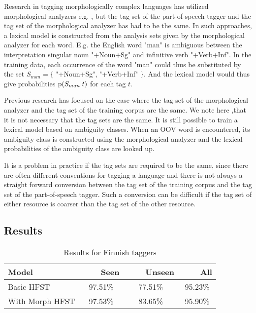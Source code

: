 \documentclass{llncs}
\begin{document}
Research in tagging morphologically complex languages has utilized
 morphological analyzers e.g. \cite{Tzoukerman:1996,Oravecz:2002}, but
 the tag set of the part-of-speech tagger and the tag set of the
 morphological analyzer has had to be the same. In such approaches, a
 lexical model is constructed from the analysis sets given by the
 morphological analyzer for each word. E.g. the English word "man" is
 ambiguous between the interpretation singular noun "+Noun+Sg" and
 infinitive verb "+Verb+Inf". In the training data, each occurrence of
 the word "man" could thus be substituted by the set $S_{man} = \{$
 "+Noun+Sg", "+Verb+Inf" $\}$. And the lexical model would thus give
 probabilities ${\rm p}(S_{man}|t)$ for each tag $t$. 

Previous research has focused on the case where the tag set of the
 morphological analyzer and the tag set of the training corpus are the
 same. We note here ,that it is not necessary that the tag sets are
 the same. It is still possible to train a lexical model based on
 ambiguity classes. When an OOV word is encountered, its ambiguity
 class is constructed using the morphological analyzer and the lexical
 probabilities of the ambiguity class are looked up.

It is a problem in practice if the tag sets are required to be the
 same, since there are often different conventions for tagging a
 language and there is not always a straight forward conversion
 between the tag set of the training corpus and the tag set of the
 part-of-speech tagger. Such a conversion can be difficult if the tag
 set of either resource is coarser than the tag set of the other
 resource.

\subsection{Results}

\begin{table}
\caption{Results for Finnish taggers}
\begin{center}
\begin{tabular}{lccc}
\hline 
Model            & ~~~~Seen & ~~~~Unseen & ~~~~All \\
\hline 
Basic HFST       &  97.51\% &    77.51\% & 95.23\% \\
With Morph HFST  &  97.53\% &    83.65\% & 95.90\% \\
\hline
\end{tabular}
\end{center}
\end{table}
\end{document}
